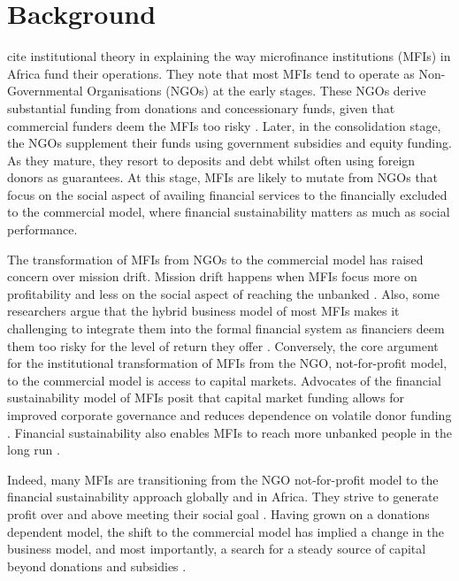 \documentclass[a4paper,nobind]{templates/ociamthesis}
\begin{document}
\hypertarget{background}{%
\section{\texorpdfstring{\textbf{Background}}{Background}}\label{background}}

\textcite{bayai2016financing} cite institutional theory in explaining the way microfinance institutions (MFIs) in Africa fund their operations. They note that most MFIs tend to operate as Non-Governmental Organisations (NGOs) at the early stages. These NGOs derive substantial funding from donations and concessionary funds, given that commercial funders deem the MFIs too risky \autocite{ledgerwood1998microfinance,ledgerwood2006transforming}. Later, in the consolidation stage, the NGOs supplement their funds using government subsidies and equity funding. As they mature, they resort to deposits and debt whilst often using foreign donors as guarantees. At this stage, MFIs are likely to mutate from NGOs that focus on the social aspect of availing financial services to the financially excluded to the commercial model, where financial sustainability matters as much as social performance.

The transformation of MFIs from NGOs to the commercial model has raised concern over mission drift. Mission drift happens when MFIs focus more on profitability and less on the social aspect of reaching the unbanked \autocite{mia2017mission,ramus2017stakeholders}. Also, some researchers argue that the hybrid business model of most MFIs makes it challenging to integrate them into the formal financial system as financiers deem them too risky for the level of return they offer \autocite{campion1999institutional}. Conversely, the core argument for the institutional transformation of MFIs from the NGO, not-for-profit model, to the commercial model is access to capital markets. Advocates of the financial sustainability model of MFIs posit that capital market funding allows for improved corporate governance and reduces dependence on volatile donor funding \autocite{garmaise2013cheap,armendariz2013subsidy}. Financial sustainability also enables MFIs to reach more unbanked people in the long run \autocite{tchakoute2010there}.

Indeed, many MFIs are transitioning from the NGO not-for-profit model to the financial sustainability approach globally and in Africa. They strive to generate profit over and above meeting their social goal \autocite{hudon2010management,wagenaar2012institutional,kodongo2013individual}. Having grown on a donations dependent model, the shift to the commercial model has implied a change in the business model, and most importantly, a search for a steady source of capital beyond donations and subsidies \autocite{armendariz2013subsidy}.
\end{document}
